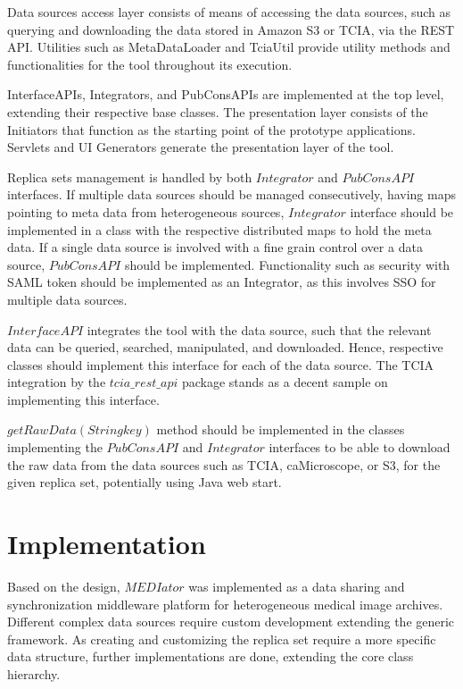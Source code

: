 \documentclass[conference]{IEEEtran}
\begin{document}
Data sources access layer consists of means of accessing the data sources, such as querying and downloading the data stored in Amazon S3 or TCIA, via the REST API. Utilities such as MetaDataLoader and TciaUtil provide utility methods and functionalities for the tool throughout its execution.

InterfaceAPIs, Integrators, and PubConsAPIs are implemented at the top level, extending their respective base classes. The presentation layer consists of the Initiators that function as the starting point of the prototype applications. Servlets and UI Generators generate the presentation layer of the tool.

Replica sets management is handled by both $Integrator$ and $PubConsAPI$ interfaces. If multiple data sources should be managed consecutively, having maps pointing to meta data from heterogeneous sources, $Integrator$ interface should be implemented in a class with the respective distributed maps to hold the meta data. If a single data source is involved with a fine grain control over a data source, $PubConsAPI$ should be implemented. Functionality such as security with SAML token should be implemented as an Integrator, as this involves SSO for multiple data sources.


$InterfaceAPI$ integrates the tool with the data source, such that the relevant data can be queried, searched, manipulated, and downloaded. Hence, respective classes should implement this interface for each of the data source. The TCIA integration by the $tcia\_rest\_api$ package stands as a decent sample on implementing this interface.

$getRawData(String key)$ method should be implemented in the classes implementing the $PubConsAPI$ and $Integrator$ interfaces to be able to download the raw data from the data sources such as TCIA, caMicroscope, or S3, for the given replica set, potentially using Java web start.

\section{Implementation}
Based on the design, $MEDIator$ was implemented as a data sharing and synchronization middleware platform for heterogeneous medical image archives. Different complex data sources require custom development extending the generic framework. As creating and customizing the replica set require a more specific data structure, further implementations are done, extending the core class hierarchy. %
\end{document}
